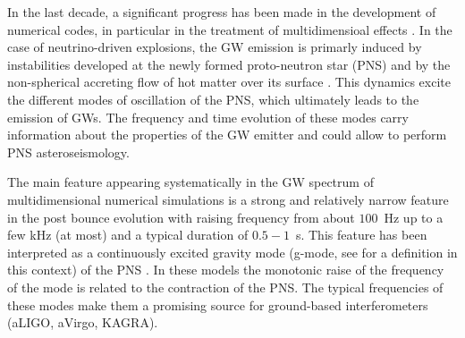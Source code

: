 In the {last decade, a significant progress has} been made in the development of numerical codes, {in particular in the treatment of multidimensioal effects \citep{BMueller:2020}.}
In the case of  neutrino-driven {explosions}, the GW emission is {primarly induced by instabilities developed at the newly formed proto-neutron star (PNS) and by the non-spherical accreting flow of hot matter over its surface \citep{Kotake:2017}.  This} dynamics excite the different modes of oscillation of the PNS{, which ultimately leads to the emission of GWs. The frequency and time evolution of these modes carry information about the
properties of the GW emitter and could allow to perform PNS asteroseismology. }





{The main feature appearing systematically in the GW spectrum of multidimensional numerical simulations is a strong and relatively narrow feature in the post bounce evolution with raising frequency
from about $100$~Hz up to a few kHz (at most) and a typical duration of $0.5-1$~s. This feature has been interpreted as a continuously excited gravity mode (g-mode, see \citep{kokkotas,Friedman:2013} for a definition in this context) of the PNS \cite{murphy:09, mueller:13gw, Cerda:2013, Yakunin:2015, Kuroda:2016, Andresen:2017}. In these models the monotonic raise of the frequency of the mode is related to the contraction of the PNS.} The {typical} frequencies of {these} modes make them {a} promising {source} for ground-based interferometers {(aLIGO, aVirgo, KAGRA)}. 
 
